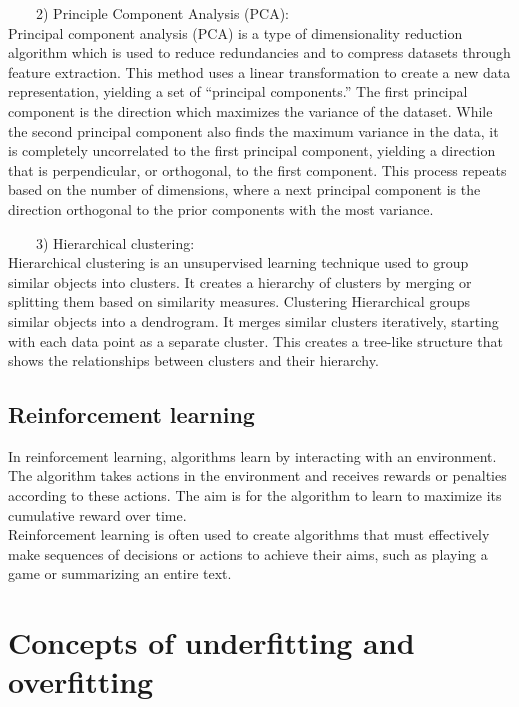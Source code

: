 \documentclass[
]{book}
\begin{document}
~~~~2) Principle Component Analysis (PCA):\\
Principal component analysis (PCA) is a type of dimensionality reduction algorithm which is used to reduce redundancies and to compress datasets through feature extraction. This method uses a linear transformation to create a new data representation, yielding a set of ``principal components.'' The first principal component is the direction which maximizes the variance of the dataset. While the second principal component also finds the maximum variance in the data, it is completely uncorrelated to the first principal component, yielding a direction that is perpendicular, or orthogonal, to the first component. This process repeats based on the number of dimensions, where a next principal component is the direction orthogonal to the prior components with the most variance.

~~~~3) Hierarchical clustering:\\
Hierarchical clustering is an unsupervised learning technique used to group similar objects into clusters. It creates a hierarchy of clusters by merging or splitting them based on similarity measures.
Clustering Hierarchical groups similar objects into a dendrogram. It merges similar clusters iteratively, starting with each data point as a separate cluster. This creates a tree-like structure that shows the relationships between clusters and their hierarchy.

\hypertarget{reinforcement-learning}{%
\subsection*{Reinforcement learning}\label{reinforcement-learning}}

In reinforcement learning, algorithms learn by interacting with an environment. The algorithm takes actions in the environment and receives rewards or penalties according to these actions. The aim is for the algorithm to learn to maximize its cumulative reward over time.\\
Reinforcement learning is often used to create algorithms that must effectively make sequences of decisions or actions to achieve their aims, such as playing a game or summarizing an entire text.

\hypertarget{concepts-of-underfitting-and-overfitting}{%
\section{\texorpdfstring{Concepts of underfitting and overfitting\\
}{Concepts of underfitting and overfitting }}\label{concepts-of-underfitting-and-overfitting}}
\end{document}
